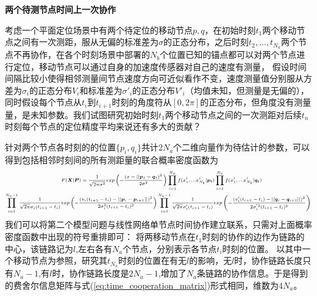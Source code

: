 \textbf{两个待测节点时间上一次协作}

考虑一个平面定位场景中有两个待定位的移动节点$p,q$，在初始时刻$t_1$两个移动节点之间有一次测距，服从无偏的标准差为$\sigma$的正态分布，之后时刻$t_2,\dots,t_{N_a}$两个节点不再协作，在各个时刻场景中部署的$N_b$个位置已知的锚点都可以对两个节点进行定位，移动节点可以通过自身的加速度传感器对自己的速度有测量，
假设时间间隔比较小使得相邻测量间节点速度方向可近似看作不变，速度测量值分别服从方差为$\sigma_i$的正态分布$V_i$和标准差为$\sigma'_i$的正态分布$V'_i$（均值未知，但测量是无偏的），同时假设每个节点从$t_i$到$t_{i+1}$时刻的角度符从$[0,2\pi]$的正态分布，但角度没有测量量，是未知参数。我们试图研究初始时刻$t_1$两个移动节点之间的一次测距对后续$t_n$时刻每个节点的定位精度平均来说还有多大的贡献？

针对两个节点各时刻的的位置$\{p_i,q_i\}$共计$2N_a$个二维向量作为待估计的参数，可以得到包括相邻时刻间的所有测距量的联合概率密度函数为
\begin{equation}
\scriptsize{
\begin{split}
&F(\bm{X}|\bm{P})=\frac{1}{\sqrt{2\pi\sigma^2}}exp\left(-\frac{(x-||\bm{p}_1-\bm{q}_1)^2}{2\sigma^2}\right)\prod_{i=1}^{N_a}
f(x^i_1,...x^{i}_{N_b}|\bm{p_i})
\prod_{i=1}^{N_a} f(x^i_1,...x^{i}_{N_b}|\bm{q_i})\\
\prod_{i=1}^{N_a-1}\frac{1}{\sqrt{2\pi}\sigma_i(t_{i+1}-t_i)}
&exp\left(-\frac{(v_i(t_{i+1}-t_i)-||\bm{p}_i-\bm{p}_{i+1}||)^2}{2\sigma_i^2(t_{i+1}-t_i)^2}\right)
\prod_{i=1}^{N_a-1}\frac{1}{\sqrt{2\pi}\sigma'_i(t_{i+1}-t_i)}
exp\left(-\frac{(v'_i(t_{i+1}-t_i)-||\bm{q}_i-\bm{q}_{i+1}||)^2}{2\sigma^{'2}_i(t_{i+1}-t_i)^2}\right)
\end{split}}
\end{equation}
我们可以将第二个模型问题与线性网络单节点时间协作建立联系，只需对上面概率密度函数中出现的符号重排即可：
将两移动节点在$t_1$时刻的协作的边作为链路的中心，该链路记为$l$,左右各有$N_a$个节点，分别表示各节点$t_i$时刻的位置。
以其中一个移动节点为参照，研究其$t_{N_a}$时刻的位置在有无$l$的影响，无$l$时，协作链路长度只有$N_a-1$,有$l$时，协作链路长度是$2N_a-1$,增加了$N_a$条链路的协作信息。于是得到的费舍尔信息矩阵与式(\ref{eq:time_cooperation_matrix})形式相同，维数为$4N_a$。

